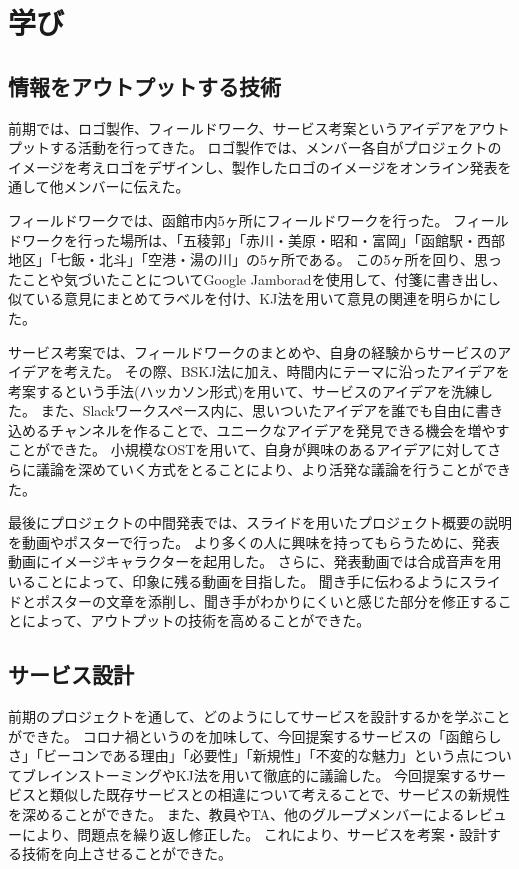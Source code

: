 \chapter{学び}

\section{情報をアウトプットする技術}
前期では、ロゴ製作、フィールドワーク、サービス考案というアイデアをアウトプットする活動を行ってきた。
ロゴ製作では、メンバー各自がプロジェクトのイメージを考えロゴをデザインし、製作したロゴのイメージをオンライン発表を通して他メンバーに伝えた。

フィールドワークでは、函館市内5ヶ所にフィールドワークを行った。
フィールドワークを行った場所は、「五稜郭」「赤川・美原・昭和・富岡」「函館駅・西部地区」「七飯・北斗」「空港・湯の川」の5ヶ所である。
この5ヶ所を回り、思ったことや気づいたことについてGoogle Jamboradを使用して、付箋に書き出し、似ている意見にまとめてラベルを付け、KJ法を用いて意見の関連を明らかにした。

サービス考案では、フィールドワークのまとめや、自身の経験からサービスのアイデアを考えた。
その際、BSKJ法に加え、時間内にテーマに沿ったアイデアを考案するという手法(ハッカソン形式)を用いて、サービスのアイデアを洗練した。
また、Slackワークスペース内に、思いついたアイデアを誰でも自由に書き込めるチャンネルを作ることで、ユニークなアイデアを発見できる機会を増やすことができた。
小規模なOSTを用いて、自身が興味のあるアイデアに対してさらに議論を深めていく方式をとることにより、より活発な議論を行うことができた。

最後にプロジェクトの中間発表では、スライドを用いたプロジェクト概要の説明を動画やポスターで行った。
より多くの人に興味を持ってもらうために、発表動画にイメージキャラクターを起用した。
さらに、発表動画では合成音声を用いることによって、印象に残る動画を目指した。
聞き手に伝わるようにスライドとポスターの文章を添削し、聞き手がわかりにくいと感じた部分を修正することによって、アウトプットの技術を高めることができた。

\section{サービス設計}
前期のプロジェクトを通して、どのようにしてサービスを設計するかを学ぶことができた。
コロナ禍というのを加味して、今回提案するサービスの「函館らしさ」「ビーコンである理由」「必要性」「新規性」「不変的な魅力」という点についてブレインストーミングやKJ法を用いて徹底的に議論した。
今回提案するサービスと類似した既存サービスとの相違について考えることで、サービスの新規性を深めることができた。
また、教員やTA、他のグループメンバーによるレビューにより、問題点を繰り返し修正した。
これにより、サービスを考案・設計する技術を向上させることができた。


